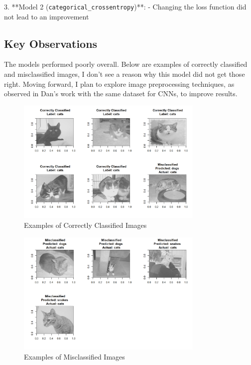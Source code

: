 \documentclass{article}
\begin{document}
3. **Model 2 (\texttt{categorical\_crossentropy})**:
   - Changing the loss function did not lead to an improvement

\subsection*{Key Observations}
The models performed poorly overall. Below are examples of correctly classified and misclassified images, I don't see a reason why this model did not get those right. Moving forward, I plan to explore image preprocessing techniques, as observed in Dan's work with the same dataset for CNNs, to improve results.

\begin{figure}[h!]
    \centering
    \includegraphics[width=0.8\textwidth]{../results/classified_examples.png}
    \caption{Examples of Correctly Classified Images}
\end{figure}

\begin{figure}[h!]
    \centering
    \includegraphics[width=0.8\textwidth]{../results/classified_images2.png}
    \caption{Examples of Misclassified Images}
\end{figure}
\end{document}
